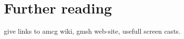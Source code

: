 \section{Further reading}
\label{sect:additional_material}
give links to amcg wiki, gmsh web-site, usefull screen casts.

